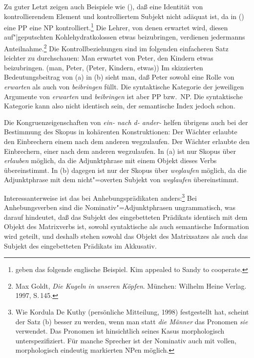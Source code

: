 Zu guter Letzt zeigen auch Beispiele wie (), daß eine Identität von kontrollierendem Element und kontrolliertem
Subjekt nicht adäquat ist, da in () eine PP eine NP kontrolliert.\footnote{
        \citet*[]{ps2} geben das folgende englische
        Beispiel.
        \ea
        Kim appealed to Sandy to cooperate.
        \zlast
}
\ea{}
Die Lehrer, von denen erwartet wird, diesen auf"|geputschten Kohlehydratkolossen etwas beizubringen,
verdienen jedermanns Anteilnahme.\footnote{
        Max Goldt, \emph{Die Kugeln in unseren Köpfen}. München: Wilhelm Heine Verlag. 1997, S.\,145.
}
\z
Die Kontrollbeziehungen sind im folgenden einfacheren Satz leichter zu durchschauen:
\eal
\ex Man erwartet von Peter, den Kindern etwas beizubringen.
\ex {}(man, Peter, (Peter, Kindern, etwas))
\zl
Im skizzierten Bedeutungsbeitrag von (a) in (b) sieht man, daß Peter sowohl eine Rolle
von \emph{erwarten} als auch von \emph{beibringen} füllt. Die syntaktische Kategorie der jeweiligen
Argumente von \emph{erwarten} und \emph{beibringen} ist aber PP bzw.\ NP. Die syntaktische Kategorie
kann also nicht identisch sein, der semantische Index jedoch schon.

Die Kongruenzeigenschaften von {\em ein- nach d- ander-} helfen übrigens auch
bei der Bestimmung des Skopus in kohärenten Konstruktionen:
\eal
\ex Der Wächter erlaubte den Einbrechern    einem     nach  dem anderen wegzulaufen.
\ex Der Wächter erlaubte den Einbrechern,   einer     nach  dem anderen wegzulaufen.
\zl
In (a) ist nur Skopus über \emph{erlauben} möglich, da die Adjunktphrase mit einem Objekt dieses Verbs
übereinstimmt. In (b) dagegen ist nur der Skopus über \emph{weglaufen} möglich, da die Adjunktphrase
mit dem nicht"=overten Subjekt von \emph{weglaufen} übereinstimmt.

Interessanterweise ist das bei Anhebungsprädikaten anders:\footnote{
       Wie Kordula De Kuthy (persönliche Mitteilung, 1998) festgestellt hat, scheint der Satz (b) besser zu werden,
       wenn man statt \emph{die Männer} das Pronomen \emph{sie} verwendet.
        \z
        Das Pronomen ist hinsichtlich seines Kasus morphologisch unterspezifiziert. Für manche Sprecher
        ist der Nominativ auch mit vollen, morphologisch eindeutig markierten NPen möglich.
}
\eal
{}
\zl
Bei Anhebungsverben sind die Nominativ"=Adjunktphrasen ungrammatisch, was darauf hindeutet,
daß das Subjekt des eingebetteten Prädikats identisch mit dem Objekt des Matrixverbs ist, \dash
sowohl syntaktische als auch semantische Information wird geteilt, und deshalb stehen sowohl das Objekt
des Matrixsatzes als auch das Subjekt des eingebetteten Prädikats im Akkusativ.

